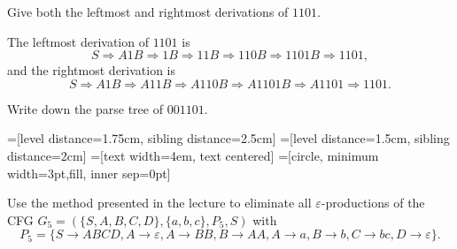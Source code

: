 \documentclass{exercise}
\begin{document}
\enlargethispage{2mm}
\subtask Give both the leftmost and rightmost derivations of $1101$.

  \begin{solution} 
    The leftmost derivation of $1101$ is
    \[ S \Rightarrow A1B \Rightarrow 1B \Rightarrow 11B \Rightarrow 110B \Rightarrow 1101B \Rightarrow 1101, \]
    and the rightmost derivation is
    \[ S \Rightarrow A1B \Rightarrow A11B \Rightarrow A110B \Rightarrow A1101B \Rightarrow A1101 \Rightarrow 1101. \]
  \end{solution} 

\subtask Write down the parse tree of $001101$.

  \begin{solution}
    \begin{center}
      =[level distance=1.75cm, sibling distance=2.5cm]
      =[level distance=1.5cm, sibling distance=2cm]
      =[text width=4em, text centered]
      =[circle, minimum width=3pt,fill, inner sep=0pt]
    \end{center}
  \end{solution} 


\subtask Use the method presented in the lecture to eliminate all $\varepsilon$-productions
 of the CFG $G_5=(\{S,A,B,C,D\},\{a,b,c\},P_5,S)$ with
 \[ P_5 = \{ S\to ABCD, A\to\varepsilon, A\to BB, B\to AA, A\to a, B\to b, C\to bc, D\to \varepsilon\}. \]
\end{document}

